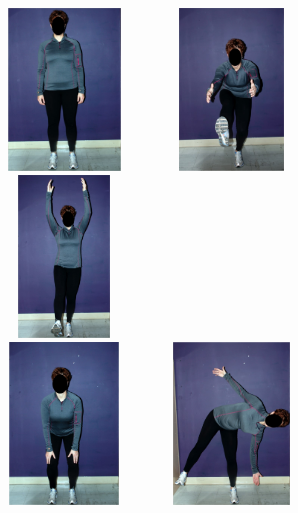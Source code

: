 \documentclass[11pt]{asaproc}
\begin{document}
\begin{figure}[t]
\begin{center} 
\includegraphics[height=4.3cm,width=4.3cm]{figures/Posture1.jpg} \hspace{1pt}
\includegraphics[height=4.3cm,width=4.3cm]{figures/Posture2.jpg} \hspace{1pt}
\includegraphics[height=4.3cm,width=4.3cm]{figures/Posture3.jpg} \hspace{1pt} \\
\includegraphics[height=4.3cm,width=4.3cm]{figures/Posture4.jpg} \hspace{1pt}
\includegraphics[height=4.3cm,width=4.3cm]{figures/Posture5.jpg} \hspace{1pt}

\end{center}
\end{figure}
\end{document}
